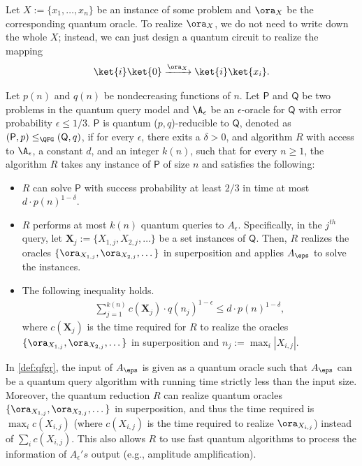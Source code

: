 \begin{definition}\label{def:oisgood}
Let $X:=\{x_1,\dots,x_n\}$ be an instance of some problem and $\ora_X$ be the corresponding quantum oracle. To realize $\ora_X$, we do not need to write down the whole $X$; instead, we can just design a quantum circuit to realize the mapping 
\begin{align}
    \ket{i}\ket{0} \xrightarrow{\ora_X} \ket{i}\ket{x_i}.
\end{align}  
\end{definition}

\begin{definition}\label{def:qfgr}
Let $p(n)$ and $q(n)$ be nondecreasing functions of $n$. Let $\mathsf{P}$ and $\mathsf{Q}$ be two problems in the quantum query model and $\A_{\epsilon}$ be an $\epsilon$-oracle for $\mathsf{Q}$ with error probability $\epsilon\leq 1/3$. $\mathsf{P}$ is quantum ($p,q$)-reducible to $\mathsf{Q}$, denoted as $(\mathsf{P},p)\leq_{\QFG} (\mathsf{Q},q)$, if for every $\epsilon$, there exits a $\delta>0$, and algorithm $R$ with access to $\A_{\epsilon}$, a constant $d$, and an integer $k(n)$, such that for every $n\ge 1$, the algorithm $R$ takes any instance of $\mathsf{P}$ of size $n$ and satisfies the following: 
\begin{itemize}
    \item $R$ can solve $\mathsf{P}$ with success probability at least $2/3$ in time at most $d\cdot p(n)^{1-\delta}$.
    \item $R$ performs at most $k(n)$ quantum queries to $A_\epsilon$. Specifically, in the $j^{th}$ query, let $\mathbf{X}_j:= \{X_{1,j},X_{2,j},\dots\}$ be a set instances of $\mathsf{Q}$. Then, $R$ realizes the oracles $\{\ora_{X_{1,j}},\ora_{X_{2,j}},\dots\}$ in superposition and applies $A_{\eps}$ to solve the instances.
    \item The following inequality holds.
    \begin{align*}
        \sum_{j=1}^{k(n)}c(\mathbf{X}_j)\cdot q(n_j)^{1-\epsilon} \leq d\cdot p(n)^{1-\delta}, 
    \end{align*}
    where $c(\mathbf{X}_j)$ is the time required for $R$ to realize the oracles $\{\ora_{X_{1,j}},\ora_{X_{2,j}},\dots\}$ in superposition and $n_j := \max_{i}|X_{i,j}|$. 
\end{itemize}
\end{definition}

In \cref{def:qfgr}, the input of $A_{\eps}$ is given as a quantum oracle such that $A_{\eps}$ can be a quantum query algorithm with running time strictly less than the input size. Moreover, the quantum reduction $R$ can realize quantum oracles $\{\ora_{X_{1,j}},\ora_{X_{2,j}},\dots\}$ in superposition, and thus the time required is $\max_i c(X_{i,j})$ (where $c(X_{i,j})$ is the time required to realize $\ora_{X_{i,j}}$) instead of $\sum_{i} c(X_{i,j})$. This also allows $R$ to use fast quantum algorithms to process the information of $A_{\epsilon}'s$ output (e.g., amplitude amplification). 

